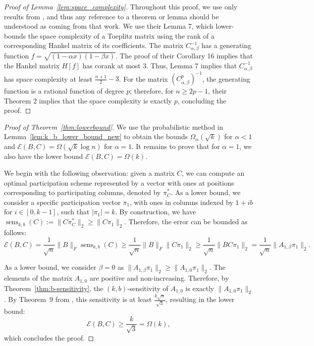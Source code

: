 \documentclass{article} %
\newcommand{\senskb}{\operatorname{sens}_{k, b}}
\begin{document}
\SpaceComplexity*


\begin{proof}[Proof of Lemma~\ref{lem:space_complexity}]
Throughout this proof, we use only results from \citet{Andersson2025}, and thus any reference to a theorem or lemma should be understood as coming from that work. We use their Lemma 7, which lower-bounds the space complexity of a Toeplitz matrix using the rank of a corresponding Hankel matrix of its coefficients. The matrix $C_{\alpha, \beta}^{-1}$ has a generating function $f = \sqrt{(1 - \alpha x)(1 - \beta x)}$. The proof of their Corollary 16 implies that the Hankel matrix $H[f]$ has corank at most 3. Thus, Lemma 7 implies that $C^{-1}_{\alpha, \beta}$ has space complexity at least $\frac{n + 1}{2} - 3$. For the matrix $(C^p_{\alpha, \beta})^{-1}$, the generating function is a rational function of degree $p$; therefore, for $n \ge 2p - 1$, their Theorem 2 implies that the space complexity is exactly $p$, concluding the proof.
\end{proof}

\LowerBound*
\begin{proof}[Proof of Theorem~\ref{thm:lowerbound}]
We use the probabilistic method in Lemma~\ref{lem:k_b_lower_bound_new} to obtain the bounds $\Omega_{\alpha}(\sqrt{k})$ for $\alpha < 1$ and $\mathcal{E}(B,C) = \Omega(\sqrt{k} \log n)$ for $\alpha = 1$. It remains to prove that for $\alpha = 1$, we also have the lower bound $\mathcal{E}(B,C) = \Omega(k)$.

We begin with the following observation: given a matrix $C$, we can compute an optimal participation scheme represented by a vector with ones at positions corresponding to participating columns, denoted by $\pi^*_C$. As a lower bound, we consider a specific participation vector $\pi_1$, with ones in columns indexed by $1 + ib$ for $i \in [0, k - 1]$, such that $|\pi_1| = k$. By construction, we have $\senskb(C) := \|C\pi^*_C\|_2 \ge \|C\pi_1\|_2$. Therefore, the error can be bounded as follows:
\begin{equation}
    \mathcal{E}(B,C) = \frac{1}{\sqrt{n}} \|B\|_F \senskb(C) 
    \ge \frac{1}{\sqrt{n}} \|B\|_F \|C\pi_1\|_2 
    \ge \frac{1}{\sqrt{n}} \|BC\pi_1\|_2 
    = \frac{1}{\sqrt{n}} \|A_{1, \beta} \pi_1\|_2.
\end{equation}

As a lower bound, we consider $\beta = 0$ as $\|A_{1, \beta}\pi_1\|_2 \ge \|A_{1, 0}\pi_1\|_2$. The elements of the matrix $A_{1, 0}$ are positive and non-increasing. Therefore, by Theorem~\ref{thm:b-sensitivity}, the $(k, b)$-sensitivity of $A_{1, 0}$ is exactly $\|A_{1, 0} \pi_1\|_2$. By Theorem~9 from \citet{kalinin2024}, this sensitivity is at least $\frac{k \sqrt{n}}{\sqrt{3}}$, resulting in the lower bound:
\begin{equation}
    \mathcal{E}(B,C) \ge \frac{k}{\sqrt{3}} = \Omega(k),
\end{equation}
which concludes the proof.
\end{proof}
\end{document}
